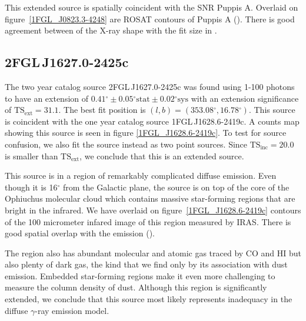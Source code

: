 \documentclass[12pt,preprint]{aastex}
\newcommand{\gev}{\text{GeV}\xspace}
\newcommand{\tsext}{{\ensuremath{\text{TS}_{\text{ext}}}}\xspace}
\newcommand{\tsinc}{\ensuremath{\text{TS}_{\text{inc}}}\xspace}
\newcommand{\sys}{\text{sys}\xspace}
\newcommand{\stat}{\text{stat}\xspace}
\renewcommand{\deg}{\ensuremath{^\circ}\xspace}
\begin{document}
This extended source is spatially coincident with the SNR Puppis A.
Overlaid on figure~\ref{1FGL_J0823.3-4248} are ROSAT contours of Puppis
A (\cite{rosat_puppis_a}). There is good agreement between of the X-ray
shape with the fit size in \gev.


\subsection{2FGL\,J1627.0-2425c}
\label{section_2FGL_J1627.0-2425c}


The two year catalog source 2FGL\,J1627.0-2425c was found 
using 1-100 \gev photons to have an 
extension of $0.41\deg\pm0.05\deg\stat\pm0.02\deg\sys$ 
with an extension significance of $\tsext=31.1$. 
The best fit position is $(l,b)=(353.08\deg, 16.78\deg)$.
This source is coincident with the one year catalog source 1FGL\,J1628.6-2419c.
A counts map showing this source is
seen in figure \ref{1FGL_J1628.6-2419c}.  To test for source confusion,
we also fit the source instead as two point sources. Since $\tsinc=20.0$
is smaller than \tsext, we conclude that this is an extended source.

This source is in a region of remarkably complicated diffuse emission.
Even though it is 16\deg from the Galactic plane, the source is on top
of the core of the Ophiuchus molecular cloud which contains massive
star-forming regions that are bright in the infrared.  We have overlaid
on figure~\ref{1FGL_J1628.6-2419c} contours of the 100 micrometer infared
image of this region measured by IRAS. There is good spatial overlap
with the \gev emission (\cite{iras_rho_ophiuci}).

The region also has abundant molecular and atomic gas traced by CO
and HI but also plenty of dark gas, the kind that we find only by its
association with dust emission. Embedded star-forming regions make it even
more challenging to measure the column density of dust.  Although this
region is significantly extended, we conclude that this source most
likely represents inadequacy in the diffuse $\gamma$-ray emission model.

\end{document}
